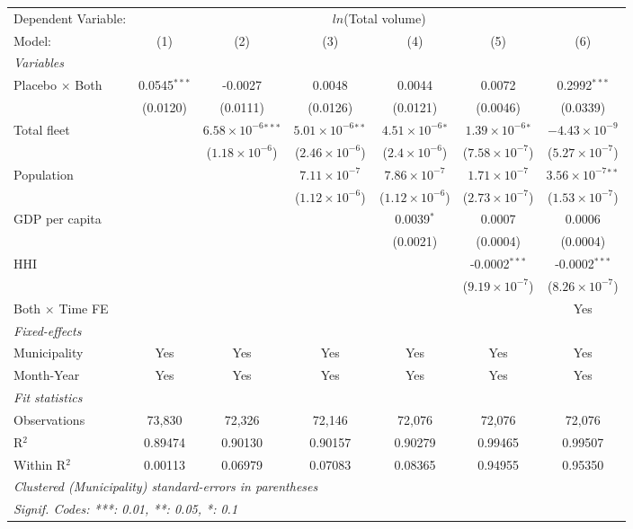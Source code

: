\documentclass[
]{article}
\begin{document}
\begin{tabular}{lcccccc}
\tabularnewline\midrule\midrule
Dependent Variable:&\multicolumn{6}{c}{$ln$(Total volume)}\\
Model:&(1) & (2) & (3) & (4) & (5) & (6)\\
\midrule \emph{Variables}&   &   &   &   &   &  \\
Placebo $\times $ Both & 0.0545$^{***}$ & -0.0027 & 0.0048 & 0.0044 & 0.0072 & 0.2992$^{***}$\\
  &(0.0120) & (0.0111) & (0.0126) & (0.0121) & (0.0046) & (0.0339)\\
Total fleet &    & $6.58\times 10^{-6}$$^{***}$ & $5.01\times 10^{-6}$$^{**}$ & $4.51\times 10^{-6}$$^{*}$ & $1.39\times 10^{-6}$$^{*}$ & $-4.43\times 10^{-9}$\\
  &   & ($1.18\times 10^{-6}$) & ($2.46\times 10^{-6}$) & ($2.4\times 10^{-6}$) & ($7.58\times 10^{-7}$) & ($5.27\times 10^{-7}$)\\
Population &    &    & $7.11\times 10^{-7}$ & $7.86\times 10^{-7}$ & $1.71\times 10^{-7}$ & $3.56\times 10^{-7}$$^{**}$\\
  &   &    & ($1.12\times 10^{-6}$) & ($1.12\times 10^{-6}$) & ($2.73\times 10^{-7}$) & ($1.53\times 10^{-7}$)\\
GDP per capita &    &    &    & 0.0039$^{*}$ & 0.0007 & 0.0006\\
  &   &    &    & (0.0021) & (0.0004) & (0.0004)\\
HHI &    &    &    &    & -0.0002$^{***}$ & -0.0002$^{***}$\\
  &   &    &    &    & ($9.19\times 10^{-7}$) & ($8.26\times 10^{-7}$)\\
Both $\times$ Time FE &  &  &  &  &  & Yes\\
\midrule \emph{Fixed-effects}&   &   &   &   &   &  \\
Municipality & Yes & Yes & Yes & Yes & Yes & Yes\\
Month-Year & Yes & Yes & Yes & Yes & Yes & Yes\\
\midrule \emph{Fit statistics}&  & & & & & \\
Observations & 73,830&72,326&72,146&72,076&72,076&72,076\\
R$^2$ & 0.89474&0.90130&0.90157&0.90279&0.99465&0.99507\\
Within R$^2$ & 0.00113&0.06979&0.07083&0.08365&0.94955&0.95350\\
\midrule\midrule\multicolumn{7}{l}{\emph{Clustered (Municipality) standard-errors in parentheses}}\\
\multicolumn{7}{l}{\emph{Signif. Codes: ***: 0.01, **: 0.05, *: 0.1}}\\
\end{tabular}
\end{document}
